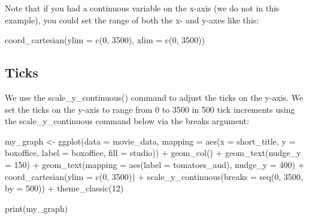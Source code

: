 \documentclass[
]{krantz}
\makeatletter
\newenvironment{Shaded}{\begin{snugshade}}{\end{snugshade}}
\newcommand{\AttributeTok}[1]{\textcolor[rgb]{0.61,0.61,0.61}{#1}}
\newcommand{\DecValTok}[1]{\textcolor[rgb]{0.06,0.06,0.06}{#1}}
\newcommand{\FunctionTok}[1]{\textcolor[rgb]{0,0,0}{#1}}
\newcommand{\NormalTok}[1]{#1}
\newcommand{\OtherTok}[1]{\textcolor[rgb]{0.37,0.37,0.37}{#1}}
\newcommand{\SpecialCharTok}[1]{\textcolor[rgb]{0,0,0}{#1}}
\newenvironment{kframe}{%
\medskip{}
\setlength{\fboxsep}{.8em}
 \def\at@end@of@kframe{}%
 \ifinner\ifhmode%
  \def\at@end@of@kframe{\end{minipage}}%
  \begin{minipage}{\columnwidth}%
 \fi\fi%
 \def\FrameCommand##1{\hskip\@totalleftmargin \hskip-\fboxsep
 \colorbox{shadecolor}{##1}\hskip-\fboxsep
     \hskip-\linewidth \hskip-\@totalleftmargin \hskip\columnwidth}%
 \MakeFramed {\advance\hsize-\width
   \@totalleftmargin\z@ \linewidth\hsize
   \@setminipage}}%
 {\par\unskip\endMakeFramed%
 \at@end@of@kframe}
\renewenvironment{Shaded}{\begin{kframe}}{\end{kframe}}
\makeatother
\begin{document}
Note that if you had a continuous variable on the x-axis (we do not in this example), you could set the range of both the x- and y-axes like this:

\begin{Shaded}
\begin{Highlighting}[]
\FunctionTok{coord\_cartesian}\NormalTok{(}\AttributeTok{ylim =} \FunctionTok{c}\NormalTok{(}\DecValTok{0}\NormalTok{, }\DecValTok{3500}\NormalTok{),}
                \AttributeTok{xlim =} \FunctionTok{c}\NormalTok{(}\DecValTok{0}\NormalTok{, }\DecValTok{3500}\NormalTok{))}
\end{Highlighting}
\end{Shaded}

\hypertarget{ticks}{%
\subsection{Ticks}\label{ticks}}

We use the scale\_y\_continuous() command to adjust the ticks on the y-axis. We set the ticks on the y-axis to range from 0 to 3500 in 500 tick increments using the scale\_y\_continuous command below via the breaks argument:

\begin{Shaded}
\begin{Highlighting}[]
\NormalTok{my\_graph }\OtherTok{\textless{}{-}} \FunctionTok{ggplot}\NormalTok{(}\AttributeTok{data =}\NormalTok{ movie\_data,}
           \AttributeTok{mapping =} \FunctionTok{aes}\NormalTok{(}\AttributeTok{x =}\NormalTok{ short\_title,}
                         \AttributeTok{y =}\NormalTok{ boxoffice,}
                         \AttributeTok{label =}\NormalTok{ boxoffice, }
                         \AttributeTok{fill =}\NormalTok{ studio)) }\SpecialCharTok{+}
  \FunctionTok{geom\_col}\NormalTok{() }\SpecialCharTok{+}
  \FunctionTok{geom\_text}\NormalTok{(}\AttributeTok{nudge\_y =} \DecValTok{150}\NormalTok{)  }\SpecialCharTok{+}
  \FunctionTok{geom\_text}\NormalTok{(}\AttributeTok{mapping =} \FunctionTok{aes}\NormalTok{(}\AttributeTok{label =}\NormalTok{ tomatoes\_aud), }
            \AttributeTok{nudge\_y =} \DecValTok{400}\NormalTok{) }\SpecialCharTok{+}
  \FunctionTok{coord\_cartesian}\NormalTok{(}\AttributeTok{ylim =} \FunctionTok{c}\NormalTok{(}\DecValTok{0}\NormalTok{, }\DecValTok{3500}\NormalTok{)) }\SpecialCharTok{+}
  \FunctionTok{scale\_y\_continuous}\NormalTok{(}\AttributeTok{breaks =} \FunctionTok{seq}\NormalTok{(}\DecValTok{0}\NormalTok{, }\DecValTok{3500}\NormalTok{, }\AttributeTok{by =} \DecValTok{500}\NormalTok{)) }\SpecialCharTok{+}
  \FunctionTok{theme\_classic}\NormalTok{(}\DecValTok{12}\NormalTok{)}

\FunctionTok{print}\NormalTok{(my\_graph)}
\end{Highlighting}
\end{Shaded}
\end{document}
